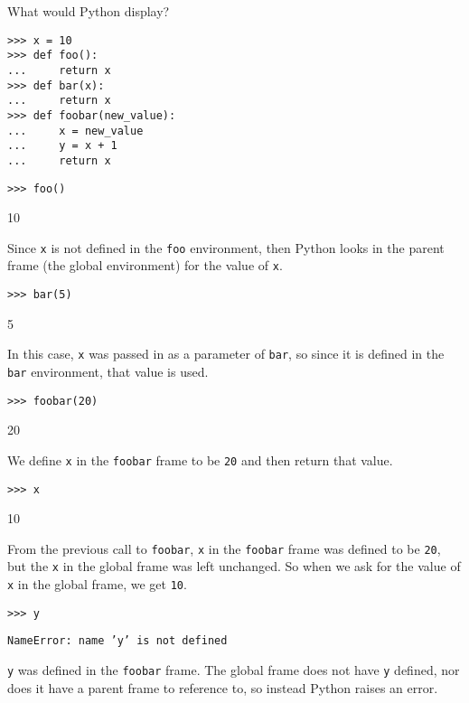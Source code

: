 
\begin{blocksection}
\question
What would Python display?

\begin{lstlisting}
>>> x = 10
>>> def foo():
...     return x
>>> def bar(x):
...     return x
>>> def foobar(new_value):
...     x = new_value
...     y = x + 1
...     return x
\end{lstlisting}
\end{blocksection}
\begin{lstlisting}
>>> foo()
\end{lstlisting}
\begin{solution}[0.5in]
10

Since \texttt{x} is not defined in the \texttt{foo} environment, then Python
looks in the parent frame (the global environment) for the value of \texttt{x}.
\end{solution}
\begin{lstlisting}
>>> bar(5)
\end{lstlisting}
\begin{solution}[0.5in]
5

In this case, \texttt{x} was passed in as a parameter of \texttt{bar}, so since
it is defined in the \texttt{bar} environment, that value is used.
\end{solution}
\begin{lstlisting}
>>> foobar(20)
\end{lstlisting}
\begin{solution}[0.5in]
20

We define \texttt{x} in the \texttt{foobar} frame to be \texttt{20} and then
return that value.
\end{solution}
\begin{lstlisting}
>>> x
\end{lstlisting}
\begin{solution}[0.5in]
10

From the previous call to \texttt{foobar}, \texttt{x} in the \texttt{foobar}
frame was defined to be \texttt{20}, but the \texttt{x} in the global frame was
left unchanged. So when we ask for the value of \texttt{x} in the global frame,
we get \texttt{10}.
\end{solution}
\begin{lstlisting}
>>> y
\end{lstlisting}
\begin{solution}[0.5in]
\texttt{NameError: name 'y' is not defined}

\texttt{y} was defined in the \texttt{foobar} frame. The global frame does not
have \texttt{y} defined, nor does it have a parent frame to reference to, so
instead Python raises an error.
\end{solution}

